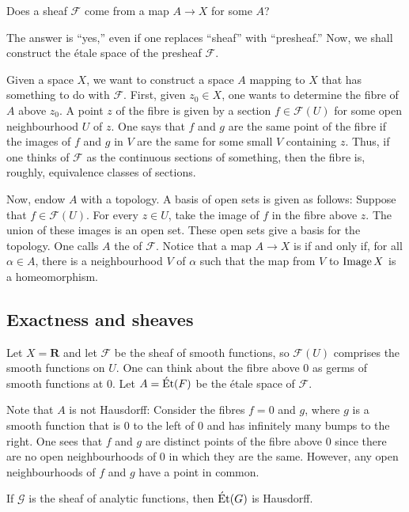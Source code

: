 \documentclass [11 pt, oneside] {article}
\begin{document}
\begin{problem}
	Does a sheaf $\mathscr{F}$ come from a map $A\longrightarrow X$ for some $A$?
\end{problem}

The answer is ``yes,'' even if one replaces ``sheaf'' with ``presheaf.'' Now, we shall construct the \'etale space of the presheaf $\mathscr{F}$. 

Given a space $X$, we want to construct a space $A$ mapping to $X$ that has something to do with $\mathscr{F}$. First, given $z_0 \in X$, one wants to determine the fibre of $A$ above $z_0$. A point $z$ of the fibre is given by a section $f\in \mathscr{F}(U)$ for some open neighbourhood $U$ of $z$. One says that $f$ and $g$ are the same point of the fibre if the images of $f$ and $g$ in $V$ are the same for some small $V$ containing $z$. Thus, if one thinks of $\mathscr{F}$ as the continuous sections of something, then the fibre is, roughly, equivalence classes of sections.

Now, endow $A$ with a topology. A basis of open sets is given as follows: Suppose that $f\in \mathscr{F}(U)$. For every $z\in U$, take the image of $f$ in the fibre above $z$. The union of these images is an open set. These open sets give a basis for the topology. One calls $A$ the  of $\mathscr{F}$. Notice that a map $A\longrightarrow X$ is  if and only if, for all $\alpha\in A$, there is a neighbourhood $V$ of $\alpha$ such that the map from $V$ to $\operatorname{Image} X$ is a homeomorphism.

\subsection{Exactness and sheaves}
\begin{example}[ ]\label{}\text{}
Let $X=\mathbf{R}$ and let $\mathscr{F}$ be the sheaf of smooth functions, so $\mathscr{F}(U)$ comprises the smooth functions on $U$. One can think about the fibre above $0$ as germs of smooth functions at $0$. Let $A = \operatorname{\acute Et} ( \relax{F})$ be the \'etale space of $\mathscr{F}$. 

Note that $A$ is not Hausdorff: Consider the fibres $f=0$ and $g$, where $g$ is a smooth function that is $0$ to the left of $0$ and has infinitely many bumps to the right. 
One sees that $f$ and $g$ are distinct points of the fibre above $0$ since there are no open neighbourhoods of $0$ in which they are the same. However, any open neighbourhoods of $f$ and $g$ have a point in common.

If $\mathscr{G}$ is the sheaf of analytic functions, then $\operatorname{\acute Et}(\relax{G})$ is Hausdorff.
\end{example}
\end{document}
